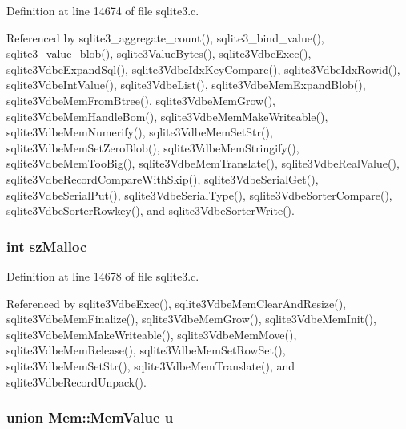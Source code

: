 Definition at line 14674 of file sqlite3.\+c.



Referenced by sqlite3\+\_\+aggregate\+\_\+count(), sqlite3\+\_\+bind\+\_\+value(), sqlite3\+\_\+value\+\_\+blob(), sqlite3\+Value\+Bytes(), sqlite3\+Vdbe\+Exec(), sqlite3\+Vdbe\+Expand\+Sql(), sqlite3\+Vdbe\+Idx\+Key\+Compare(), sqlite3\+Vdbe\+Idx\+Rowid(), sqlite3\+Vdbe\+Int\+Value(), sqlite3\+Vdbe\+List(), sqlite3\+Vdbe\+Mem\+Expand\+Blob(), sqlite3\+Vdbe\+Mem\+From\+Btree(), sqlite3\+Vdbe\+Mem\+Grow(), sqlite3\+Vdbe\+Mem\+Handle\+Bom(), sqlite3\+Vdbe\+Mem\+Make\+Writeable(), sqlite3\+Vdbe\+Mem\+Numerify(), sqlite3\+Vdbe\+Mem\+Set\+Str(), sqlite3\+Vdbe\+Mem\+Set\+Zero\+Blob(), sqlite3\+Vdbe\+Mem\+Stringify(), sqlite3\+Vdbe\+Mem\+Too\+Big(), sqlite3\+Vdbe\+Mem\+Translate(), sqlite3\+Vdbe\+Real\+Value(), sqlite3\+Vdbe\+Record\+Compare\+With\+Skip(), sqlite3\+Vdbe\+Serial\+Get(), sqlite3\+Vdbe\+Serial\+Put(), sqlite3\+Vdbe\+Serial\+Type(), sqlite3\+Vdbe\+Sorter\+Compare(), sqlite3\+Vdbe\+Sorter\+Rowkey(), and sqlite3\+Vdbe\+Sorter\+Write().

\hypertarget{struct_mem_a56d1abb60aeee5af56cbe04752733cd3}{}
\subsubsection[{sz\+Malloc}]{\setlength{\rightskip}{0pt plus 5cm}int sz\+Malloc}\label{struct_mem_a56d1abb60aeee5af56cbe04752733cd3}


Definition at line 14678 of file sqlite3.\+c.



Referenced by sqlite3\+Vdbe\+Exec(), sqlite3\+Vdbe\+Mem\+Clear\+And\+Resize(), sqlite3\+Vdbe\+Mem\+Finalize(), sqlite3\+Vdbe\+Mem\+Grow(), sqlite3\+Vdbe\+Mem\+Init(), sqlite3\+Vdbe\+Mem\+Make\+Writeable(), sqlite3\+Vdbe\+Mem\+Move(), sqlite3\+Vdbe\+Mem\+Release(), sqlite3\+Vdbe\+Mem\+Set\+Row\+Set(), sqlite3\+Vdbe\+Mem\+Set\+Str(), sqlite3\+Vdbe\+Mem\+Translate(), and sqlite3\+Vdbe\+Record\+Unpack().

\hypertarget{struct_mem_a7ec4547fa6cefb081c68a98628fe43ac}{}
\subsubsection[{u}]{\setlength{\rightskip}{0pt plus 5cm}union {\bf Mem\+::\+Mem\+Value}  u}\label{struct_mem_a7ec4547fa6cefb081c68a98628fe43ac}
\hypertarget{struct_mem_a95b9bece3b8200fe5d56d20aa4c6ea94}{}
